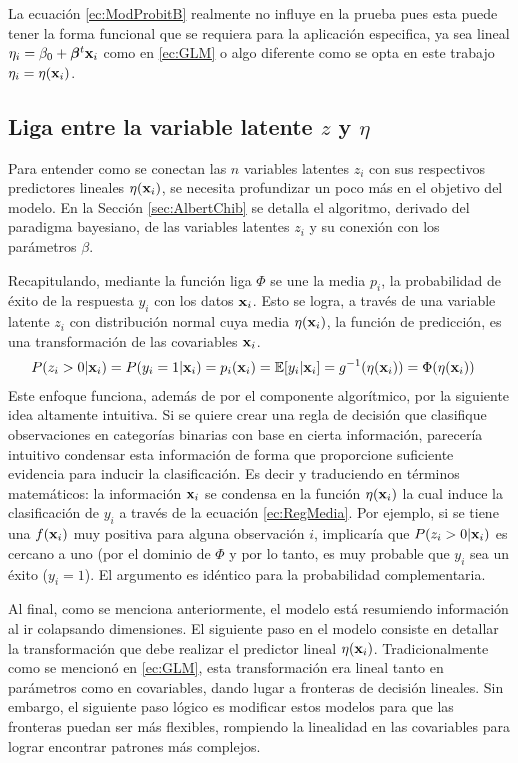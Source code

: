 \documentclass[../Main/Main.tex]{subfiles}
\begin{document}
La ecuación \eqref{ec:ModProbitB} realmente no influye en la prueba pues esta puede tener la forma funcional que se requiera para la aplicación especifica, ya sea lineal $\eta_i = \beta_0 + \bm{\beta}^t\mathbf{x}_i$ como en \eqref{ec:GLM} o algo diferente como se opta en este trabajo $\eta_i = \eta(\mathbf{x}_i)$.

\subsection*{Liga entre la variable latente $z$ y $\eta$} \label{sec:VarLat}
Para entender como se conectan las $n$ variables latentes $z_i$ con sus respectivos predictores lineales $\eta(\mathbf{x}_i)$, se necesita profundizar un poco más en el objetivo del modelo. En la Sección \ref{sec:AlbertChib} se detalla el algoritmo, derivado del paradigma bayesiano, de las variables latentes $z_i$ y su conexión con los parámetros $\beta$. 

Recapitulando, mediante la función liga $\Phi$ se une la media $p_i$, la probabilidad de éxito de la respuesta $y_i$ con los datos $\mathbf{x}_i$. Esto se logra, a través de una variable latente $z_i$ con distribución normal cuya media $\eta(\mathbf{x}_i)$, la función de predicción, es una transformación de las covariables $\mathbf{x}_i$.
\begin{align} \label{ec:RegMedia}
	P(z_i > 0|\mathbf{x}_i) = P(y_i = 1|\mathbf{x}_i)= p_i(\mathbf{x}_i) &=\mathbb{E}[y_i|\mathbf{x}_i] = g^{-1}(\eta(\mathbf{x}_i)) = \Phi(\eta(\mathbf{x}_i))
\end{align}
Este enfoque funciona, además de por el componente algorítmico, por la siguiente idea altamente intuitiva. Si se quiere crear una regla de decisión que clasifique observaciones en categorías binarias con base en cierta información, parecería intuitivo condensar esta información de  forma que proporcione suficiente evidencia para inducir la clasificación. Es decir y traduciendo en términos matemáticos: la información $\mathbf{x}_i$ se condensa en la función $\eta(\mathbf{x}_i)$ la cual induce la clasificación de $y_i$ a través de la ecuación \eqref{ec:RegMedia}. Por ejemplo, si se tiene una $f(\mathbf{x}_i)$ muy positiva para alguna observación $i$, implicaría que $P(z_i > 0|\mathbf{x}_i)$ es cercano a uno (por el dominio de $\Phi$ y por lo tanto, es muy probable que $y_i$ sea un éxito ($y_i = 1$). El argumento es idéntico para la probabilidad complementaria.

Al final, como se menciona anteriormente, el modelo está resumiendo información al ir colapsando dimensiones. El siguiente paso en el modelo consiste en detallar la transformación que debe realizar el predictor lineal $\eta(\mathbf{x}_i)$. Tradicionalmente como se mencionó en \eqref{ec:GLM}, esta transformación era lineal tanto en parámetros como en covariables, dando lugar a fronteras de decisión lineales. Sin embargo, el siguiente paso lógico es modificar estos modelos para que las fronteras puedan ser más flexibles, rompiendo la linealidad en las covariables para lograr encontrar patrones más complejos. 
\end{document}
